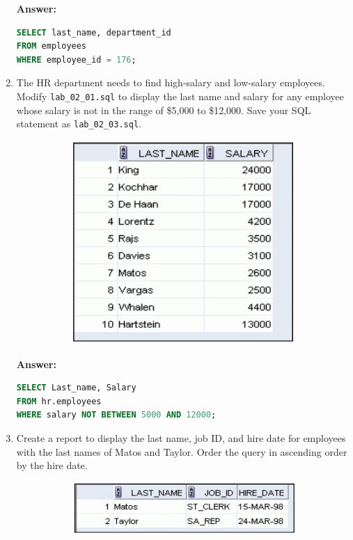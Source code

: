 \documentclass[a4paper,12pt]{article}
\begin{document}
\begin{enumerate}
    \textbf{Answer: }
    \begin{lstlisting}[language=SQL, label={lst:employees_data}]
SELECT last_name, department_id
FROM employees
WHERE employee_id = 176;
    \end{lstlisting}
    \item The HR department needs to find high-salary and low-salary employees. Modify
\texttt{lab\_02\_01.sql} to display the last name and salary for any employee whose salary is not in
the range of \$5,000 to \$12,000. Save your SQL statement as \texttt{lab\_02\_03.sql}.
\begin{figure}[h]
        \centering
        \begin{subfigure}[b]{0.35\linewidth}
            \centering
            \includegraphics[width=\linewidth]{graphics/23.png}
        \end{subfigure}
    \end{figure}        
    \newpage
    \textbf{Answer: }
    \begin{lstlisting}[language=SQL, label={lst:employees_data}]
SELECT Last_name, Salary
FROM hr.employees
WHERE salary NOT BETWEEN 5000 AND 12000;
    \end{lstlisting}
    \item Create a report to display the last name, job ID, and hire date for employees with the last names
of Matos and Taylor. Order the query in ascending order by the hire date.
\begin{figure}[h]
        \centering
        \begin{subfigure}[b]{0.35\linewidth}
            \centering
            \includegraphics[width=\linewidth]{graphics/24.png}
        \end{subfigure}
    \end{figure}        
    

\end{enumerate}
\end{document}
